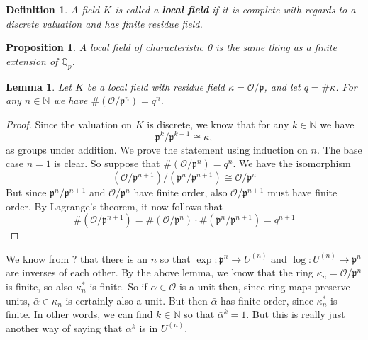 \documentclass{article}
\newtheorem{definition}{Definition}[section]
\newtheorem{proposition}{Proposition}[section]
\newtheorem{lemma}{Lemma}[section]
\newcommand{\mfrak}[1]{\mathfrak{#1}}
\newcommand{\mcal}[1]{\mathcal{#1}}
\newcommand{\mbb}[1]{\mathbb{#1}}
\begin{document}
\begin{definition}
    A field $K$ is called a \textbf{local field} if it is complete with regards to a discrete valuation and has finite residue field.
\end{definition}

\begin{proposition}
    A local field of characteristic 0 is the same thing as a finite extension of $\mbb Q_p$.
\end{proposition}

\begin{lemma}
    Let $K$ be a local field with residue field $\kappa = \mcal O / \mfrak p$, and let $q = \# \kappa$. For any $n \in \mbb N$ we have $\# (\mcal O / \mfrak p^n) = q^n$.
\end{lemma}

\begin{proof}
    Since the valuation on $K$ is discrete, we know that for any $k \in \mbb N$ we have $$\mfrak p^k / \mfrak p^{k+1} \cong \kappa,$$
    as groups under addition. We prove the statement using induction on $n$. The base case $n = 1$ is clear. So suppose that $\# (\mcal O / \mfrak p^n) = q^n$. We have the isomorphism
    $$(\mcal O / \mfrak p^{n+1}) / (\mfrak p^n / \mfrak p^{n+1}) \cong \mcal O / \mfrak p^{n}$$
    But since $\mfrak p^n / \mfrak p^{n+1}$ and $\mcal O / \mfrak p^{n}$ have finite order, also $\mcal O / \mfrak p^{n+1}$ must have finite order. By Lagrange's theorem, it now follows that $$\# (\mcal O / \mfrak p^{n+1}) = \# (\mcal O / \mfrak p^{n}) \cdot \# (\mfrak p^n / \mfrak p^{n+1}) = q^{n+1}$$
\end{proof}

We know from ? that there is an $n$ so that $\exp : \mfrak p^n \to U^{(n)}$ and $\log : U^{(n)} \to \mfrak p^n$ are inverses of each other. By the above lemma, we know that the ring $\kappa_n = \mcal{O} / \mfrak p^n$ is finite, so also $\kappa_n^*$ is finite. So if $\alpha \in \mcal O$ is a unit then, since ring maps preserve units, $\bar \alpha \in \kappa_n$ is certainly also a unit. But then $\bar \alpha$ has finite order, since $\kappa_n^*$ is finite. In other words, we can find $k \in \mbb N$ so that $\bar \alpha^k = \bar 1$. But this is really just another way of saying that $\alpha^k$ is in $U^{(n)}$.
\end{document}
